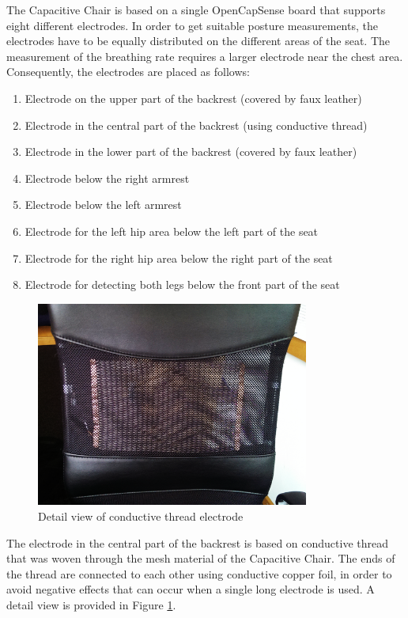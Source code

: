 The Capacitive Chair is based on a single OpenCapSense board that supports eight different electrodes. In order to get suitable posture measurements, the electrodes have to be equally distributed on the different areas of the seat. The measurement of the breathing rate requires a larger electrode near the chest area. Consequently, the electrodes are placed as follows:
\begin{enumerate}
\item Electrode on the upper part of the backrest (covered by faux leather)
\item Electrode in the central part of the backrest (using conductive thread)
\item Electrode in the lower part of the backrest (covered by faux leather)
\item Electrode below the right armrest
\item Electrode below the left armrest
\item Electrode for the left hip area below the left part of the seat
\item Electrode for the right hip area below the right part of the seat
\item Electrode for detecting both legs below the front part of the seat
\end{enumerate}

\begin{figure}[ht]
\centering
\includegraphics[width=0.8\textwidth]{images/prot_capchair_threadelectrode}
\caption{Detail view of conductive thread electrode}
\label{fig:prot_capchair_threadelectrode}
\end{figure}

The electrode in the central part of the backrest is based on conductive thread that was woven through the mesh material of the Capacitive Chair. The ends of the thread are connected to each other using conductive copper foil, in order to avoid negative effects that can occur when a single long electrode is used. A detail view is provided in Figure \ref{fig:prot_capchair_threadelectrode}.
 
